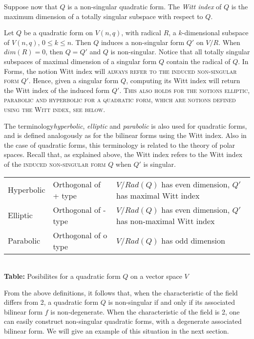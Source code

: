 \documentclass[a4paper,11pt]{report}
\begin{document}
{{Suppose now that $Q$ is a non-singular quadratic form. The \emph{Witt index} of $Q$ is the maximum dimension of a totally singular subspace with respect to $Q$. 

 Let $Q$ be a quadratic form on $V(n,q)$, with radical $R$, a $k$-dimensional subspace of $V(n,q)$, $0 \leq k \leq n$. Then $Q$ induces a non-singular form $Q'$ on $V/R$. When $dim(R)=0$, then $Q=Q'$ and $Q$ is non-singular. Notice that all totally singular subspaces of maximal
dimension of a singular form $Q$ contain the radical of $Q$. In \textsf{Forms}, the notion Witt index will \textsc{always refer to the induced non-singular form} $Q'$. Hence, given a singular form $Q$, computing its Witt index will return the Witt index of the induced form $Q'$. \textsc{This also holds for the notions elliptic, parabolic and hyperbolic for a
quadratic form, which are notions defined using the Witt index, see below}. 

 The terminology\emph{hyperbolic}, \emph{elliptic} and \emph{parabolic} is also used for quadratic forms, and is defined analogously as for the
bilinear forms using the Witt index. Also in the case of quadratic forms, this
terminology is related to the theory of polar spaces. Recall that, as
explained above, the Witt index refers to the Witt index of the \textsc{induced non-singular form} $Q$ when $Q'$ is singular. \begin{center}
\begin{tabular}{l|l|l}\hline
Hyperbolic&
Orthogonal of + type&
$V/Rad(Q)$ has even dimension, $Q'$ has maximal Witt index\\
Elliptic&
Orthogonal of - type&
$V/Rad(Q)$ has even dimension, $Q'$ has non-maximal Witt index\\
Parabolic&
Orthogonal of o type&
$V/Rad(Q)$ has odd dimension\\
\hline
\end{tabular}\\[2mm]
\textbf{Table: }Posibilites for a quadratic form $Q$ on a vector space $V$\end{center}

 From the above definitions, it follows that, when the characteristic of the
field differs from 2, a quadratic form $Q$ is non-singular if and only if its associated bilinear form $f$ is non-degenerate. When the characteristic of the field is 2, one can easily
construct non-singular quadratic forms, with a degenerate associated bilinear
form. We will give an example of this situation in the next section. 
}}
\end{document}
